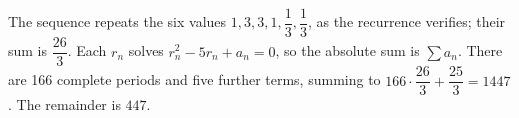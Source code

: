 The sequence repeats the six values $1 , 3 , 3 , 1 , \dfrac{1}{3} , \dfrac{1}{3}$, as the recurrence verifies; their sum is $\dfrac{26}{3}$. Each $r_n$ solves $r_n^2-5r_n+a_n=0$, so the absolute sum is $\sum a_n$. There are 166 complete periods and five further terms, summing to $166 \cdot \dfrac{26}{3} + \dfrac{25}{3} = 1447$. The remainder is $\boxed{447}$.
